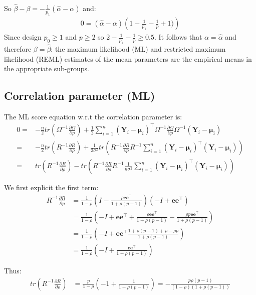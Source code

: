 \documentclass[12pt]{article}
\newcommand\Ve{\mathbf{e}}
\newcommand\VY{\mathbf{Y}}
\newcommand\Vmu{\boldsymbol{\mu}}
\newcommand\trans[1]{{#1}^\intercal}%
\begin{document}
So \(\widehat{\beta} - \beta = -\frac{1}{p_1}(\widehat{\alpha} - \alpha)\) and:
\begin{align*}
0 = (\widehat{\alpha} - \alpha)\left(1-\frac{1}{p_1}-\frac{1}{p}+1) \right)
\end{align*}
Since design \(p_0 \geq 1\) and \(p \geq 2\) so \(2-\frac{1}{p_1}-\frac{1}{p} \geq 0.5\). It
follows that \(\alpha = \widehat{\alpha}\) and therefore
\(\beta=\widehat{\beta}\): the maximum likelihood (ML) and restricted
maximum likelihood (REML) estimates of the mean parameters are the
empirical means in the appropriate sub-groups.

\subsection{Correlation parameter (ML)}
\label{sec:org497694c}

The ML score equation w.r.t the correlation parameter is:
\begin{align*}
0 =& -\frac{n}{2} tr\left(\Omega^{-1} \frac{\partial \Omega}{\partial\rho}\right) + \frac{1}{2} \sum_{i=1}^n \trans{(\VY_i-\Vmu_i)} \Omega^{-1} \frac{\partial \Omega}{\partial \rho} \Omega^{-1} (\VY_i-\Vmu_i) \\
  =& -\frac{n}{2} tr\left(R^{-1} \frac{\partial R}{\partial\rho}\right) + \frac{1}{2\sigma^2} tr\left(R^{-1} \frac{\partial R}{\partial \rho} R^{-1} \sum_{i=1}^n \trans{(\VY_i-\Vmu_i)}  (\VY_i-\Vmu_i)\right) \\
  =& tr\left(R^{-1} \frac{\partial R}{\partial\rho}\right) - tr\left(R^{-1} \frac{\partial R}{\partial \rho} R^{-1} \frac{1}{n \sigma^2}\sum_{i=1}^n \trans{(\VY_i-\Vmu_i)} (\VY_i-\Vmu_i) \right) 
\end{align*}


We first explicit the first term:
\begin{align*}
R^{-1} \frac{\partial R}{\partial\rho} &= \frac{1}{1-\rho} \left(I - \frac{\rho \Ve\trans{\Ve}}{1+\rho(p-1)}\right)\left(-I + \Ve\trans{\Ve}\right) \\
&= \frac{1}{1-\rho} \left(-I + \Ve\trans{\Ve} + \frac{\rho \Ve\trans{\Ve}}{1+\rho(p-1)} - \frac{\rho p \Ve\trans{\Ve}}{1+\rho(p-1)}\right)\\
&= \frac{1}{1-\rho} \left(-I + \Ve\trans{\Ve} \frac{1+\rho(p-1)+\rho-\rho p}{1+\rho(p-1)}\right)\\
&= \frac{1}{1-\rho} \left(-I +  \frac{\Ve\trans{\Ve}}{1+\rho(p-1)}\right)
\end{align*}

Thus:
\begin{align*}
tr \left( R^{-1} \frac{\partial R}{\partial\rho} \right) &= \frac{p}{1-\rho}\left(-1+\frac{1}{1+\rho(p-1)}\right) = -\frac{p\rho(p-1)}{(1-\rho)(1+\rho(p-1))}
\end{align*}
\end{document}
